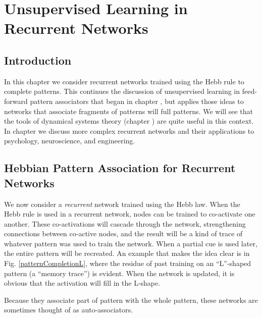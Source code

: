 \chapter{Unsupervised Learning in Recurrent Networks}\label{ch_unsupervised_recurrent}


\section{Introduction}

In this chapter we consider recurrent networks trained using the Hebb rule to complete patterns. This continues the discussion of unsupervised learning in feed-forward pattern associators that began in chapter , but applies those ideas to networks that associate fragments of patterns will full patterns. We will see that the tools of dynamical systems theory (chapter ) are quite useful in this context. In chapter  we discuss more complex recurrent networks and their applications to psychology, neuroscience, and engineering.
  
\section{Hebbian Pattern Association for Recurrent Networks}

We now consider a \emph{recurrent} network trained using the Hebb law. When the Hebb rule is used in a recurrent network, nodes can be trained to co-activate one another. These co-activations will cascade through the network, strengthening connections between co-active nodes, and the result will be a kind of trace of whatever pattern was used to train the network. When a partial cue is used later, the entire pattern will be recreated. An example that makes the idea clear is in Fig. \ref{patternCompletionL}, where the residue of past training on an ``L''-shaped pattern (a ``memory trace'') is evident. When the network is updated, it is obvious that the activation will fill in the L-shape. 

Because they associate part of pattern with the whole pattern, these networks are sometimes thought of as auto-associators.

